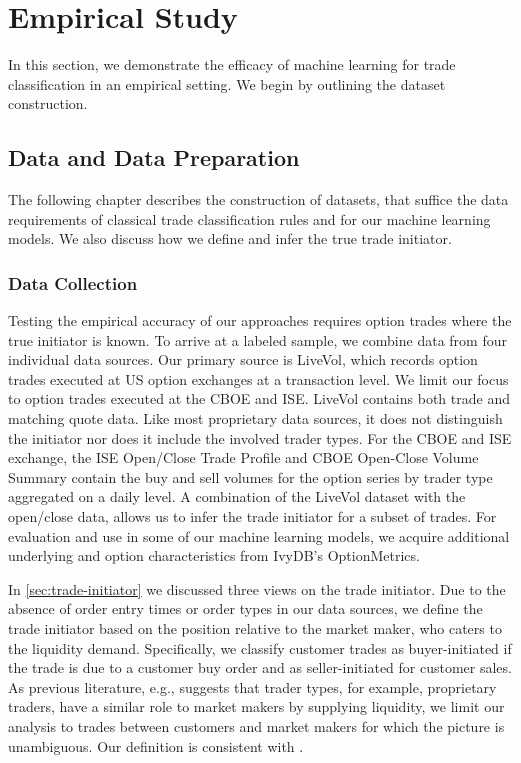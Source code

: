 \section{Empirical Study}\label{sec:empirical-study}

In this section, we demonstrate the efficacy of machine learning for trade classification in an empirical setting. We begin by outlining the dataset construction.

\subsection{Data and Data Preparation}\label{sec:data-and-data-preparation}

The following chapter describes the construction of datasets, that suffice the data requirements of classical trade classification rules and for our machine learning models. We also discuss how we define and infer the true trade initiator.

\subsubsection{Data Collection}\label{sec:data-collection}


Testing the empirical accuracy of our approaches requires option trades where the true initiator is known. To arrive at a labeled sample, we combine data from four individual data sources. Our primary source is LiveVol, which records option trades executed at US option exchanges at a transaction level. We limit our focus to option trades executed at the \gls{CBOE} and \gls{ISE}. LiveVol contains both trade and matching quote data. Like most proprietary data sources, it does not distinguish the initiator nor does it include the involved trader types. For the \gls{CBOE} and \gls{ISE} exchange, the \gls{ISE} Open/Close Trade Profile and \gls{CBOE} Open-Close Volume Summary contain the buy and sell volumes for the option series by trader type aggregated on a daily level. A combination of the LiveVol dataset with the open/close data, allows us to infer the trade initiator for a subset of trades. For evaluation and use in some of our machine learning models, we acquire additional underlying and option characteristics from IvyDB's OptionMetrics.

In \cref{sec:trade-initiator} we discussed three views on the trade initiator. Due to the absence of order entry times or order types in our data sources, we define the trade initiator based on the position relative to the market maker, who caters to the liquidity demand. Specifically, we classify customer trades as buyer-initiated if the trade is due to a customer buy order and as seller-initiated for customer sales. As previous literature, e.g., \textcite[\checkmark][4276]{garleanuDemandBasedOptionPricing2009} suggests that trader types, for example, proprietary traders, have a similar role to market makers by supplying liquidity, we limit our analysis to trades between customers and market makers for which the picture is unambiguous. Our definition is consistent with \textcite[\checkmark][8]{grauerOptionTradeClassification2022}.


